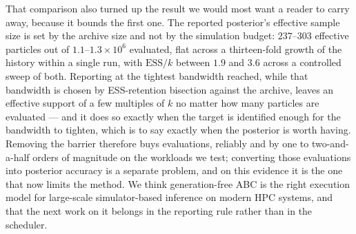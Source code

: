 That comparison also turned up the result we would most want a reader to carry away, because it bounds the first one. The reported posterior's effective sample size is set by the archive size and not by the simulation budget: $237$--$303$ effective particles out of $1.1$--$1.3\times10^6$ evaluated, flat across a thirteen-fold growth of the history within a single run, with $\mathrm{ESS}/k$ between $1.9$ and $3.6$ across a controlled sweep of both. Reporting at the tightest bandwidth reached, while that bandwidth is chosen by ESS-retention bisection against the archive, leaves an effective support of a few multiples of $k$ no matter how many particles are evaluated --- and it does so exactly when the target is identified enough for the bandwidth to tighten, which is to say exactly when the posterior is worth having. Removing the barrier therefore buys evaluations, reliably and by one to two-and-a-half orders of magnitude on the workloads we test; converting those evaluations into posterior accuracy is a separate problem, and on this evidence it is the one that now limits the method. We think generation-free ABC is the right execution model for large-scale simulator-based inference on modern HPC systems, and that the next work on it belongs in the reporting rule rather than in the scheduler.

